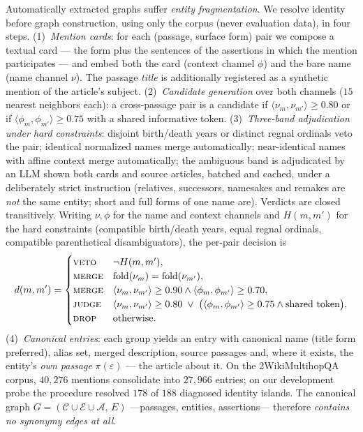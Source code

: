 \documentclass[11pt,a4paper]{article}
\begin{document}
Automatically extracted graphs suffer \emph{entity fragmentation}. We resolve
identity before graph construction, using only the corpus (never evaluation
data), in four steps. (1)~\emph{Mention cards}: for each (passage, surface
form) pair we compose a textual card --- the form plus the sentences of the
assertions in which the mention participates --- and embed both the card
(context channel $\phi$) and the bare name (name channel $\nu$). The passage
\emph{title} is additionally registered as a synthetic mention of the
article's subject. (2)~\emph{Candidate generation} over both channels
($15$ nearest neighbors each): a cross-passage pair is a candidate if
$\langle\nu_m,\nu_{m'}\rangle\ge 0.80$ or if
$\langle\phi_m,\phi_{m'}\rangle\ge 0.75$ with a shared informative token.
(3)~\emph{Three-band adjudication under hard constraints}: disjoint
birth/death years or distinct regnal ordinals veto the pair; identical
normalized names merge automatically; near-identical names with affine
context merge automatically; the ambiguous band is adjudicated by an LLM
shown both cards and source articles, batched and cached, under a
deliberately strict instruction (relatives, successors, namesakes and remakes
are \emph{not} the same entity; short and full forms of one name are).
Verdicts are closed transitively. Writing $\nu,\phi$ for the name and
context channels and $H(m,m')$ for the hard constraints (compatible
birth/death years, equal regnal ordinals, compatible parenthetical
disambiguators), the per-pair decision is
\begin{equation}
d(m,m')=
\begin{cases}
\textsc{veto} & \neg H(m,m'),\\
\textsc{merge} & \operatorname{fold}(\nu_m)=\operatorname{fold}(\nu_{m'}),\\
\textsc{merge} & \langle\nu_m,\nu_{m'}\rangle\ge0.90 \wedge \langle\phi_m,\phi_{m'}\rangle\ge0.70,\\
\textsc{judge} & \langle\nu_m,\nu_{m'}\rangle\ge0.80 \;\vee\;
                \bigl(\langle\phi_m,\phi_{m'}\rangle\ge0.75 \wedge \text{shared token}\bigr),\\
\textsc{drop} & \text{otherwise.}
\end{cases}
\label{eq:adjudication}
\end{equation}
(4)~\emph{Canonical entries}: each group
yields an entry with canonical name (title form preferred), alias set,
merged description, source passages and, where it exists, the entity's
\emph{own passage} $\pi(\varepsilon)$ --- the article about it. On the
2WikiMultihopQA corpus, $40{,}276$ mentions consolidate into $27{,}966$
entries; on our development probe the procedure resolved $178$ of $188$
diagnosed identity islands. The canonical graph
$G=(\mathcal C\cup\mathcal E\cup\mathcal A,\,E)$ ---passages, entities,
assertions--- therefore \emph{contains no synonymy edges at all}.
\end{document}
